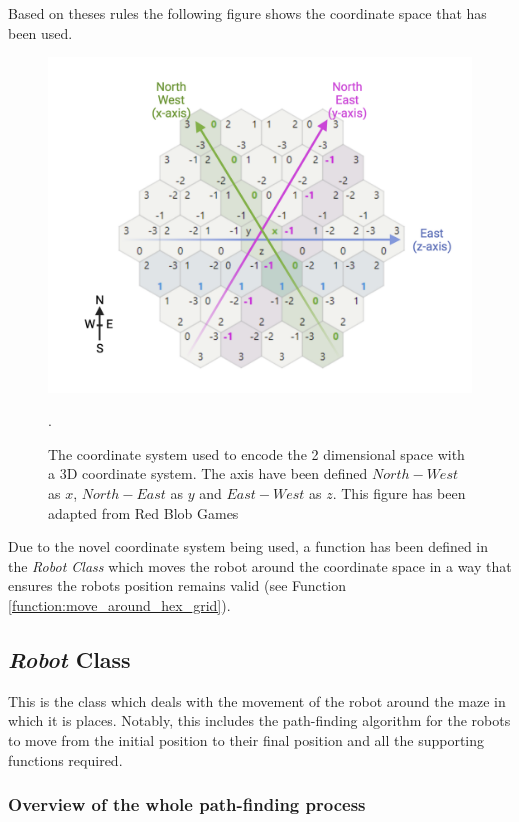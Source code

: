 Based on theses rules the following figure shows the coordinate space that has been used. 
\begin{figure}[h]
    \centering
    \includegraphics[scale=0.35]{images/hexagon_coordinates_adapted.png}
    \caption{The coordinate system used to encode the 2 dimensional space with a 3D coordinate system. The axis have been defined $North-West$ as $x$, $North-East$ as  $y$ and $East-West$ as $z$. This figure has been adapted from Red Blob Games \cite{patel_2021}}.
    \label{Hexagonal grid coordinates}
\end{figure}

Due to the novel coordinate system being used, a function has been defined in the \textit{Robot Class} which moves the robot around the coordinate space in a way that ensures the robots position remains valid (see Function \ref{function:move_around_hex_grid}).

\pagebreak
\subsection{\textit{Robot} Class}

This is the class which deals with the movement of the robot around the maze in which it is places. Notably, this includes the path-finding algorithm for the robots to move from the initial position to their final position and all the supporting functions required.

\subsubsection{Overview of the whole path-finding process}

